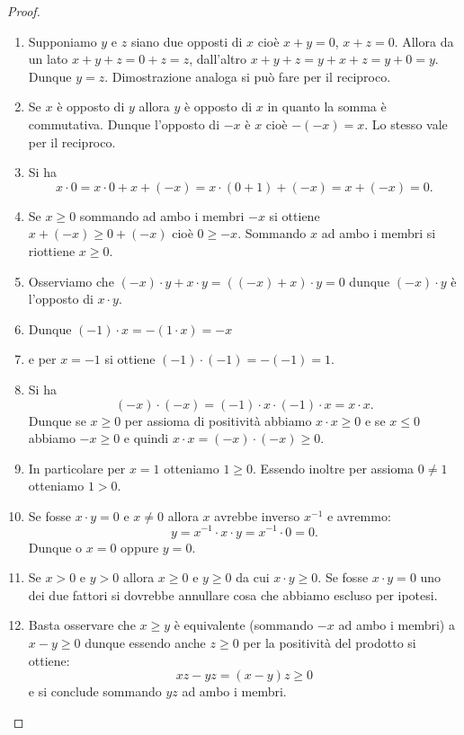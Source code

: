 \begin{proof}
\begin{enumerate}
\item
Supponiamo $y$ e $z$ siano due opposti di $x$ cioè $x+y=0$, $x+z=0$.
Allora da un lato $x+y+z = 0+z = z$, dall'altro $x+y+z = y+x+z= y+ 0 = y$.
Dunque $y=z$. Dimostrazione analoga si può fare per il reciproco.

\item
Se $x$ è opposto di $y$ allora $y$ è opposto di $x$ in quanto la somma
è commutativa. Dunque l'opposto di $-x$ è $x$ cioè $-(-x)=x$. Lo stesso
vale per il reciproco.

\item
Si ha
\[
x\cdot 0 = x \cdot 0 + x + (-x) %
=x\cdot(0+1) + (-x) = x + (-x) = 0.
\]

\item
Se $x\ge 0$ sommando ad ambo i membri $-x$ si ottiene $x+(-x) \ge 0 + (-x)$
cioè $0 \ge -x$. Sommando $x$ ad ambo i membri si riottiene $x\ge 0$.


\item
Osserviamo che $(-x)\cdot y + x\cdot y = ((-x)+x)\cdot y = 0$ dunque $(-x)\cdot y$ è l'opposto di $x\cdot y$.

\item
Dunque $(-1)\cdot x = - (1 \cdot x) = - x$

\item
e per $x=-1$ si ottiene $(-1)\cdot(-1) = -(-1) = 1$.

\item
Si ha
\[
(-x)\cdot(-x) = (-1)\cdot x \cdot (-1)\cdot x = x\cdot x.
\]
Dunque se $x\ge 0$ per assioma di positività
abbiamo $x\cdot x\ge 0$ e se $x\le 0$ abbiamo $-x\ge 0$ e quindi
$x\cdot x = (-x)\cdot(-x) \ge 0$.

\item
In particolare per $x=1$ otteniamo $1\ge 0$.
Essendo inoltre per assioma $0\neq 1$ otteniamo $1> 0$.

\item
Se fosse $x\cdot y = 0$ e $x\neq 0$ allora $x$ avrebbe inverso $x^{-1}$
e avremmo:
\[
  y = x^{-1} \cdot x \cdot y = x^{-1}\cdot 0 = 0.
\]
Dunque o $x=0$ oppure $y=0$.

\item
Se $x>0$ e $y>0$ allora $x\ge 0$ e $y\ge 0$ da cui $x\cdot y\ge 0$.
Se fosse $x\cdot y=0$ uno dei due fattori si dovrebbe annullare
cosa che abbiamo escluso per ipotesi.

\item
Basta osservare che $x\ge y$ è equivalente
(sommando $-x$ ad ambo i membri) a $x-y\ge 0$
dunque essendo anche $z\ge 0$ per la positività
del prodotto si ottiene:
\[
xz - yz = (x-y)z \ge 0
\]
e si conclude sommando $yz$ ad ambo i membri.
\end{enumerate}
\end{proof}


